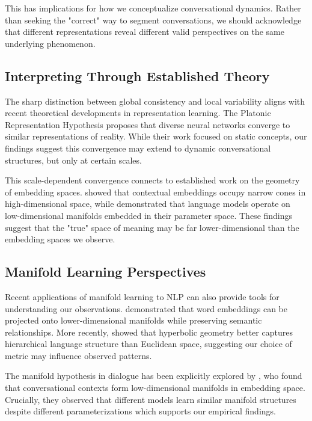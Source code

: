 \documentclass[11pt,letterpaper]{article}
\begin{document}
This has implications for how we conceptualize conversational dynamics. Rather than seeking the "correct" way to segment conversations, we should acknowledge that different representations reveal different valid perspectives on the same underlying phenomenon.

\subsection{Interpreting Through Established Theory}

The sharp distinction between global consistency and local variability aligns with recent theoretical developments in representation learning. The Platonic Representation Hypothesis \citep{huh2024platonic} proposes that diverse neural networks converge to similar representations of reality. While their work focused on static concepts, our findings suggest this convergence may extend to dynamic conversational structures, but only at certain scales.

This scale-dependent convergence connects to established work on the geometry of embedding spaces. \citet{ethayarajh2019contextual} showed that contextual embeddings occupy narrow cones in high-dimensional space, while \citet{aghajanyan2021intrinsic} demonstrated that language models operate on low-dimensional manifolds embedded in their parameter space. These findings suggest that the "true" space of meaning may be far lower-dimensional than the embedding spaces we observe.

\subsection{Manifold Learning Perspectives}

Recent applications of manifold learning to NLP can also provide tools for understanding our observations. \citet{hasan2017manifold} demonstrated that word embeddings can be projected onto lower-dimensional manifolds while preserving semantic relationships. More recently, \citet{chen2024hypformer} showed that hyperbolic geometry better captures hierarchical language structure than Euclidean space, suggesting our choice of metric may influence observed patterns.

The manifold hypothesis in dialogue has been explicitly explored by \citet{ruppik2024topology}, who found that conversational contexts form low-dimensional manifolds in embedding space. Crucially, they observed that different models learn similar manifold structures despite different parameterizations which  supports our empirical findings.
\end{document}
